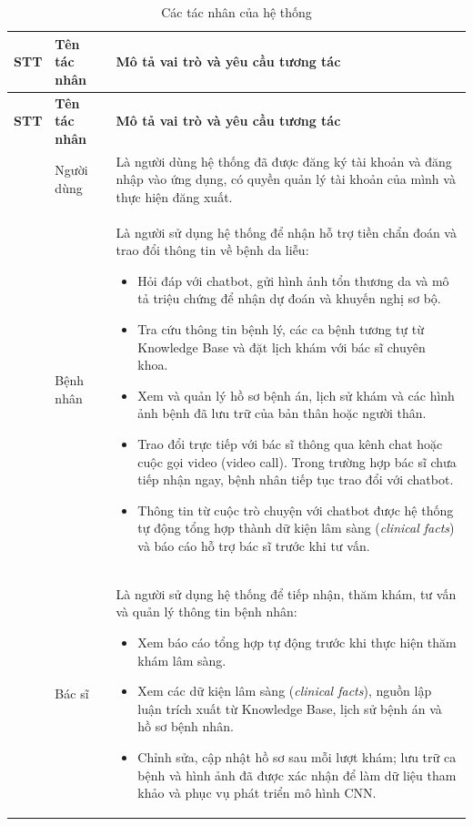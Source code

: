 \begin{longtable}{|>{\raggedright\arraybackslash}p{0.08\dimexpr\linewidth-6\tabcolsep\relax}|>{\raggedright\arraybackslash}p{0.18\dimexpr\linewidth-6\tabcolsep\relax}|>{\raggedright\arraybackslash}p{0.74\dimexpr\linewidth-6\tabcolsep\relax}|}
\caption{Các tác nhân của hệ thống}\label{tab:tac-nhan}\\
\hline
\textbf{STT} & \textbf{Tên tác nhân} & \textbf{Mô tả vai trò và yêu cầu tương tác} \\ \hline
\endfirsthead
\hline
\textbf{STT} & \textbf{Tên tác nhân} & \textbf{Mô tả vai trò và yêu cầu tương tác} \\ \hline
\endhead
1 & Người dùng & Là người dùng hệ thống đã được đăng ký tài khoản và đăng nhập vào ứng dụng, có quyền quản lý tài khoản của mình và thực hiện đăng xuất. \\ \hline
2 & Bệnh nhân & Là người sử dụng hệ thống để nhận hỗ trợ tiền chẩn đoán và trao đổi thông tin về bệnh da liễu:
\begin{itemize}[leftmargin=*,nosep]
  \item Hỏi đáp với chatbot, gửi hình ảnh tổn thương da và mô tả triệu chứng để nhận dự đoán và khuyến nghị sơ bộ.
  \item Tra cứu thông tin bệnh lý, các ca bệnh tương tự từ Knowledge Base và đặt lịch khám với bác sĩ chuyên khoa.
  \item Xem và quản lý hồ sơ bệnh án, lịch sử khám và các hình ảnh bệnh đã lưu trữ của bản thân hoặc người thân.
  \item Trao đổi trực tiếp với bác sĩ thông qua kênh chat hoặc cuộc gọi video (video call). Trong trường hợp bác sĩ chưa tiếp nhận ngay, bệnh nhân tiếp tục trao đổi với chatbot.
  \item Thông tin từ cuộc trò chuyện với chatbot được hệ thống tự động tổng hợp thành dữ kiện lâm sàng (\textit{clinical facts}) và báo cáo hỗ trợ bác sĩ trước khi tư vấn.
\end{itemize} \\ \hline
3 & Bác sĩ & Là người sử dụng hệ thống để tiếp nhận, thăm khám, tư vấn và quản lý thông tin bệnh nhân:
\begin{itemize}[leftmargin=*,nosep]
  \item Xem báo cáo tổng hợp tự động trước khi thực hiện thăm khám lâm sàng.
  \item Xem các dữ kiện lâm sàng (\textit{clinical facts}), nguồn lập luận trích xuất từ Knowledge Base, lịch sử bệnh án và hồ sơ bệnh nhân.
  \item Chỉnh sửa, cập nhật hồ sơ sau mỗi lượt khám; lưu trữ ca bệnh và hình ảnh đã được xác nhận để làm dữ liệu tham khảo và phục vụ phát triển mô hình CNN.

\end{itemize}
\end{longtable}
